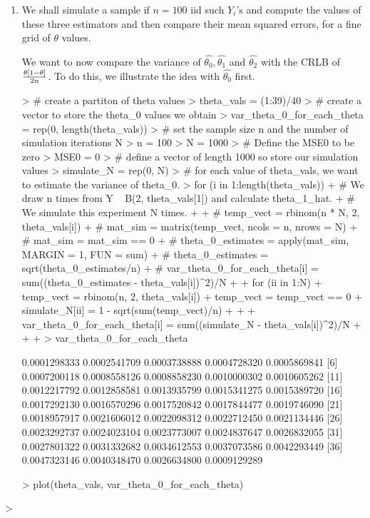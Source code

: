 \documentclass[12pt, a4paper]{article}
\begin{document}
\begin{enumerate}[label={\bfseries\arabic*.}]
{}

\item We shall simulate a sample if $n = 100$ iid such $Y_i$’s and compute the values of these three estimators and then compare their mean squared errors, for a fine grid of $\theta$ values.

{\setlength{\leftskip}{3ex}

We want to now compare the variance of $\hat{\theta_0}, \hat{\theta_1}$ and $\hat{\theta_2}$ with the CRLB of $\frac{\theta\left[1 - \theta\right]}{2n}$. To do this, we illustrate the idea with $\hat{\theta_0}$ first. 

\begin{Schunk}
\begin{Sinput}
> # create a partiton of theta values
> theta_vals = (1:39)/40
> # create a vector to store the theta_0 values we obtain
> var_theta_0_for_each_theta = rep(0, length(theta_vals))
> # set the sample size n and the number of simulation iterations N
> n = 100
> N = 1000
> # Define the MSE0 to be zero 
> MSE0 = 0
> # define a vector of length 1000 so store our simulation values
> simulate_N = rep(0, N)
> # for each value of theta_vals, we want to estimate the variance of theta_0. 
> for (i in 1:length(theta_vals)) {
+   # We draw n times from Y ~ B(2, theta_vals[1]) and calculate theta_1_hat. 
+   # We simulate this experiment N times. 
+   
+   # temp_vect = rbinom(n * N, 2, theta_vals[i])
+   # mat_sim = matrix(temp_vect, ncols = n, nrows = N)
+   # mat_sim = mat_sim == 0
+   # theta_0_estimates = apply(mat_sim, MARGIN = 1, FUN = sum)
+   # theta_0_estimates = sqrt(theta_0_estimates/n)
+   # var_theta_0_for_each_theta[i] = sum((theta_0_estimates - theta_vals[i])^2)/N
+   
+   for (ii in 1:N) {
+     temp_vect = rbinom(n, 2, theta_vals[i])
+     temp_vect = temp_vect == 0
+     simulate_N[ii] = 1 - sqrt(sum(temp_vect)/n)
+   }
+   
+   var_theta_0_for_each_theta[i] = sum((simulate_N - theta_vals[i])^2)/N
+   
+   
+ }
> var_theta_0_for_each_theta
\end{Sinput}
\begin{Soutput}
 [1] 0.0001298333 0.0002541709 0.0003738888 0.0004728320 0.0005869841
 [6] 0.0007200118 0.0008558126 0.0008858230 0.0010000302 0.0010605262
[11] 0.0012217792 0.0012858581 0.0013935799 0.0015341275 0.0015389720
[16] 0.0017292130 0.0016570296 0.0017520842 0.0017844477 0.0019746090
[21] 0.0018957917 0.0021606012 0.0022098312 0.0022712450 0.0021134446
[26] 0.0023292737 0.0024023104 0.0023773007 0.0024837647 0.0026832055
[31] 0.0027801322 0.0031332682 0.0034612553 0.0037073586 0.0042293449
[36] 0.0047323146 0.0040348470 0.0026634800 0.0009129289
\end{Soutput}
\begin{Sinput}
> plot(theta_vals, var_theta_0_for_each_theta)
\end{Sinput}
\end{Schunk}

}
\end{enumerate}

\begin{Schunk}
\begin{Sinput}
> 
\end{Sinput}
\end{Schunk}
\end{document}
